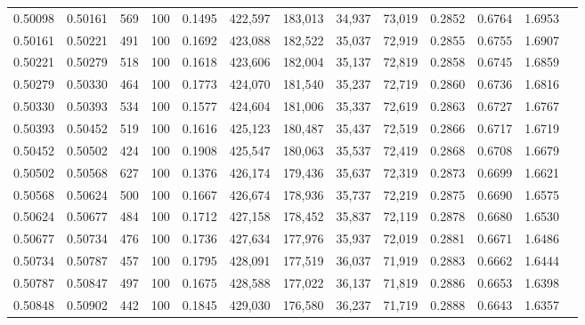 \begin{tabular}{rrrrrrrrrrrrr}
0.50098 & 0.50161 &   569 & 100 &                                     0.1495 & 422,597 & 183,013 &  34,937 &  73,019 & 0.2852 & 0.6764 & 1.6953 \\
0.50161 & 0.50221 &   491 & 100 &                                     0.1692 & 423,088 & 182,522 &  35,037 &  72,919 & 0.2855 & 0.6755 & 1.6907 \\
0.50221 & 0.50279 &   518 & 100 &                                     0.1618 & 423,606 & 182,004 &  35,137 &  72,819 & 0.2858 & 0.6745 & 1.6859 \\
0.50279 & 0.50330 &   464 & 100 &                                     0.1773 & 424,070 & 181,540 &  35,237 &  72,719 & 0.2860 & 0.6736 & 1.6816 \\
0.50330 & 0.50393 &   534 & 100 &                                     0.1577 & 424,604 & 181,006 &  35,337 &  72,619 & 0.2863 & 0.6727 & 1.6767 \\
0.50393 & 0.50452 &   519 & 100 &                                     0.1616 & 425,123 & 180,487 &  35,437 &  72,519 & 0.2866 & 0.6717 & 1.6719 \\
0.50452 & 0.50502 &   424 & 100 &                                     0.1908 & 425,547 & 180,063 &  35,537 &  72,419 & 0.2868 & 0.6708 & 1.6679 \\
0.50502 & 0.50568 &   627 & 100 &                                     0.1376 & 426,174 & 179,436 &  35,637 &  72,319 & 0.2873 & 0.6699 & 1.6621 \\
0.50568 & 0.50624 &   500 & 100 &                                     0.1667 & 426,674 & 178,936 &  35,737 &  72,219 & 0.2875 & 0.6690 & 1.6575 \\
0.50624 & 0.50677 &   484 & 100 &                                     0.1712 & 427,158 & 178,452 &  35,837 &  72,119 & 0.2878 & 0.6680 & 1.6530 \\
0.50677 & 0.50734 &   476 & 100 &                                     0.1736 & 427,634 & 177,976 &  35,937 &  72,019 & 0.2881 & 0.6671 & 1.6486 \\
0.50734 & 0.50787 &   457 & 100 &                                     0.1795 & 428,091 & 177,519 &  36,037 &  71,919 & 0.2883 & 0.6662 & 1.6444 \\
0.50787 & 0.50847 &   497 & 100 &                                     0.1675 & 428,588 & 177,022 &  36,137 &  71,819 & 0.2886 & 0.6653 & 1.6398 \\
0.50848 & 0.50902 &   442 & 100 &                                     0.1845 & 429,030 & 176,580 &  36,237 &  71,719 & 0.2888 & 0.6643 & 1.6357 \\

\end{tabular}

